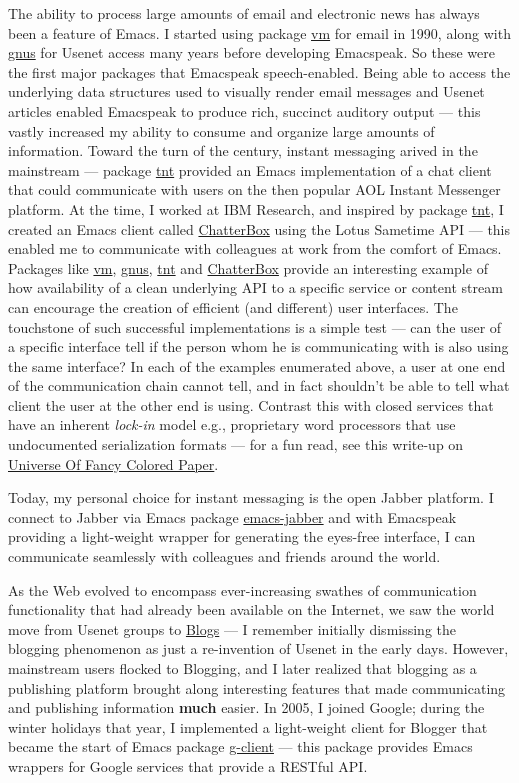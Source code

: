 \documentclass[11pt]{article}
\begin{document}
The ability to process large amounts of email and electronic news
has always been a feature of Emacs. I started using package \uline{vm}
for email in 1990, along with \uline{gnus} for Usenet access many years
before developing Emacspeak. So these were the first major
packages that Emacspeak speech-enabled. Being able to access the
underlying data structures used to visually render email messages
and Usenet articles enabled Emacspeak to produce rich, succinct
auditory output — this vastly increased my ability to consume and
organize large amounts of information. Toward the turn of the
century, instant messaging arived in the mainstream — package
\uline{tnt} provided an Emacs implementation of a chat client that
could communicate with users on the then popular AOL Instant
Messenger platform. At the time, I worked at IBM Research, and
inspired by package \uline{tnt}, I created an Emacs client called
\uline{ChatterBox} using the Lotus Sametime API — this enabled me to
communicate with colleagues at work from the comfort of
Emacs. Packages like \uline{vm}, \uline{gnus}, \uline{tnt} and \uline{ChatterBox} provide
an interesting example of how availability of a clean underlying
API to a specific service or content stream can encourage the
creation of efficient (and different) user interfaces. The
touchstone of such successful implementations is a simple test —
can the user of a specific interface tell if the person whom he
is communicating with is also using the same interface? In each
of the examples enumerated above, a user at one end of the
communication chain cannot tell, and in fact shouldn't be able to
tell what client the user at the other end is using. Contrast
this with closed services that have an inherent \emph{lock-in} model
e.g., proprietary word processors that use undocumented
serialization formats — for a fun read, see this write-up on
\href{http://emacspeak.sourceforge.net/publications/colored-paper.html}{Universe
Of Fancy Colored Paper}.


Today, my personal choice for instant messaging is the open
Jabber platform. I connect to Jabber via Emacs package
\uline{emacs-jabber} and with Emacspeak providing a light-weight
wrapper for generating the eyes-free interface, I can communicate
seamlessly with colleagues and friends around the world.

As the Web evolved to encompass ever-increasing swathes of
communication functionality that had already been available on
the Internet, we saw the world move from Usenet groups to \uline{Blogs}
— I remember initially dismissing the blogging phenomenon as just
a re-invention of Usenet in the early days. However, mainstream
users flocked to Blogging, and I later realized that blogging as
a publishing platform brought along interesting features that
made communicating and publishing information \textbf{much} easier. In
2005, I joined Google; during the winter holidays that year, I
implemented a light-weight client for Blogger that became the
start of Emacs package \uline{g-client} — this package provides Emacs
wrappers for Google services that provide a RESTful API.
\end{document}
